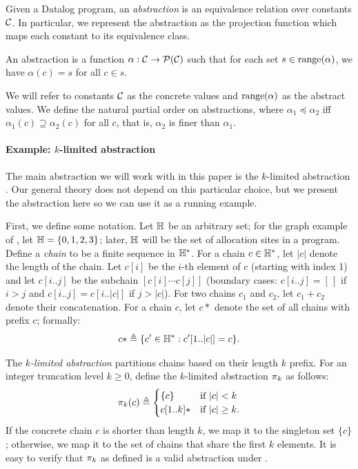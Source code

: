 Given a Datalog program, an {\em abstraction} is an equivalence relation over
constants $\mathcal{C}$.  In particular, we represent the abstraction as the projection
function which maps each constant to its equivalence class.
\begin{definition}
\label{def:abstraction}
An abstraction is a function $\alpha : \mathcal{C} \to \mathcal{P}(\mathcal{C})$
such that for each set $s \in \text{\rm range}(\alpha)$,
we have $\alpha(c) = s$ for all $c \in s$.
\end{definition}
\noindent
We will refer to constants $\mathcal{C}$ as the concrete values and $\text{\rm range}(\alpha)$ as
the abstract values.
We define the natural partial order on abstractions,
where $\alpha_1 \preceq \alpha_2$ iff $\alpha_1(c) \supseteq \alpha_2(c)$ for all $c$,
that is, $\alpha_2$ is finer than $\alpha_1$.

\paragraph{Example: $k$-limited abstraction}

The main abstraction we will work with in this paper is the $k$-limited abstraction \cite{kcfa,kobj}.
Our general theory does not depend on this particular choice, but we present
the abstraction here so we can use it as a running example.

First, we define some notation.
Let ${\mathbb H}$ be an arbitrary set;
for the graph example of , let ${\mathbb H} = \{ 0, 1, 2, 3 \}$;
later, ${\mathbb H}$ will be the set of allocation sites in a program.
Define a {\em chain} to be a finite sequence in ${\mathbb H}^*$.
For a chain $c \in {\mathbb H}^*$, let $|c|$ denote the length of the chain.
Let $c[i]$ be the $i$-th element of $c$ (starting with index 1) and
let $c[i..j]$ be the subchain $[c[i] \cdots c[j]]$
(boundary cases: $c[i..j] = [\,]$ if $i > j$ and $c[i..j] = c[i..|c|]$ if $j > |c|$).
For two chains $c_1$ and $c_2$, let $c_1+c_2$ denote their concatenation.
For a chain $c$, let $c*$ denote the set of all chains
with prefix $c$; formally:
\begin{align}
c* \triangleq \{ c' \in {\mathbb H}^* : c'[1..|c|] = c \}.
\end{align}

The {\em $k$-limited abstraction}
partitions chains based on their length $k$ prefix.
For an integer truncation level $k \ge 0$, define the $k$-limited abstraction $\pi_k$ as follows:
\begin{align}
\label{eqn:klimitedAbstraction}
\pi_k(c) \triangleq
\begin{cases}
\{c\}     & \text{if $|c| < k$} \\
c[1..k]*  & \text{if $|c| \ge k$}. \\
\end{cases}
\end{align}
If the concrete chain $c$ is shorter than length $k$,
we map it to the singleton set $\{ c \}$;
otherwise, we map it to the set of chains that share the first $k$ elements.
It is easy to verify that $\pi_k$ as defined is a valid abstraction under .

